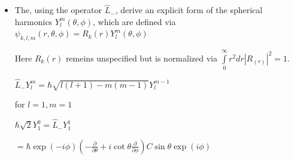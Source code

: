 \documentclass[11pt,a4paper]{scrartcl}
\newcommand{\abs}[1]{\left| #1 \right|}
\begin{document}
\begin{enumerate}
\begin{itemize}
\begin{calculationbox}
                            ($_+ Y_l^m = \hbar \sqrt{l(l + 1) - m (m + 1)} Y_l^m + 1$)

                            For $l = 1$ holds true: $\hat{L}_+ Y_1^1 = 0$ and $Y_1^1$ is eigenfunction from $_3$ with $m = 1$: $Y_1^1(\theta, \phi) = f(\theta) \exp(i \phi)$

                            so we plug it in: 

                            $0 = \hat{L}_+ Y_1^1$

                            $= \hbar \exp(i \phi) (\frac{\partial}{\partial \theta} + i \cot\theta \frac{\partial}{\partial \phi})f(\theta)\exp(i\phi)$

                            $= \hbar \exp(i \phi)(f'(\theta) \exp(i\phi) + i \cot\theta i f(\theta) \exp{i\phi})$

                            So we get: $f'(\theta) - \cot\theta f(\theta) = 0$

                            $\frac{f'(\theta)}{f(\theta)} = \cot\theta$

                            Integrate: $\ln{f(\theta)} = \ln(\sin\theta) + C$

                            $f(\theta) = C \sin\theta$

                            Therefore $Y_1^1(\theta, \phi) = C \sin\theta \exp(i\phi)$
                        \end{calculationbox}

                    \item
                        The, using the operator $\hat{L}_-$, derive an explicit form of the spherical harmonics $Y_l^m(\theta, \phi)$, which are defined via $\psi_{k, l, m}(r, \theta, \phi) = R_k(r) Y_l^m(\theta, \phi)$

                        Here $R_k(r)$ remeins unspecified but is normalized via $\int\limits_0^\infty r^2 dr \abs{R_(r)}^2 = 1$.

                        \begin{calculationbox}
                            $\hat{L}_- Y_l^m = \hbar \sqrt{l(l+1) - m (m - 1)} Y_l^{m-1}$

                            for $l=1, m=1$

                            \begin{calculationbox}
                                $\hbar \sqrt{2} Y_1^0 = \hat{L}_-Y_1^1 $

                                $= \hbar \exp(-i \phi) (-\frac{\partial}{\partial \theta} + i \cot\theta \frac{\partial }{\partial \phi}) C \sin\theta \exp(i \phi)$


\end{calculationbox}
\end{calculationbox}
\end{itemize}
\end{enumerate}
\end{document}
